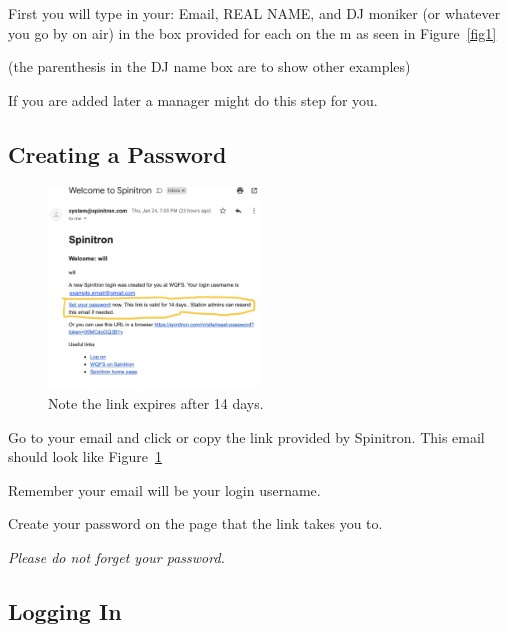 \documentclass[12pt]{article}
\begin{document}
First you will type in your: Email, REAL NAME, and DJ moniker (or whatever you go by on air) in the box provided for each on the m as seen in Figure~\ref{fig1} 

(the parenthesis in the DJ name box are to show other examples) 

If you are added later a manager might do this step for you.


\vspace{1.0cm}

\subsection{Creating a Password}

\begin{figure}
    \includegraphics[width=0.5\textwidth]{images/email.png}
    \caption{Note the link expires after 14 days.}
    \label{fig2}
\end{figure}

Go to your email and click or copy the link provided by Spinitron. 
This email should look like Figure~\ref{fig2}

Remember your email will be your login username.

Create your password on the page that the link takes you to.

{\it Please do not forget your password.}

\clearpage
\newpage

\subsection{Logging In}
\end{document}
